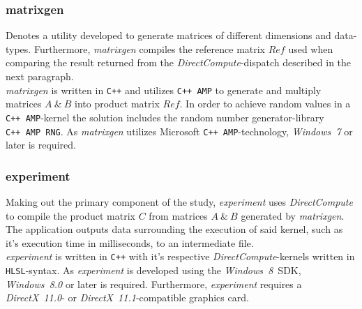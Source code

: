 \documentclass[a4paper,twocolumn,10pt]{article}
\begin{document}
\subsubsection{matrixgen}
Denotes a utility developed to generate matrices of different dimensions and data-types. Furthermore, \textit{matrixgen} compiles the reference matrix $Ref$ used when comparing the result returned from the \textit{DirectCompute}-dispatch described in the next paragraph.\\
\textit{matrixgen} is written in \texttt{C++} and utilizes \texttt{C++~AMP} to generate and multiply matrices $A~\&~B$ into product matrix $Ref$. In order to achieve random values in a \texttt{C++~AMP}-kernel the solution includes the random number generator-library \texttt{C++~AMP~RNG}. As \textit{matrixgen} utilizes Microsoft \texttt{C++~AMP}-technology, \textit{Windows~7} or later is required.

\subsubsection{experiment}
Making out the primary component of the study, \textit{experiment} uses \textit{DirectCompute} to compile the product matrix $C$ from matrices $A~\&~B$ generated by \textit{matrixgen}. The application outputs data surrounding the execution of said kernel, such as it's execution time in milliseconds, to an intermediate file.\\
\textit{experiment} is written in \texttt{C++} with it's respective \textit{DirectCompute}-kernels written in \texttt{HLSL}-syntax. As \textit{experiment} is developed using the \textit{Windows~8}~SDK, \textit{Windows~8.0} or later is required. Furthermore, \textit{experiment} requires a \textit{DirectX~11.0}- or \textit{DirectX~11.1}-compatible graphics card.
\end{document}
